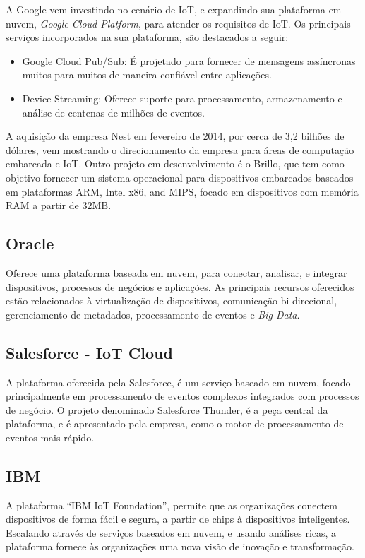 A Google vem investindo no cenário de IoT, e expandindo sua plataforma
em nuvem, \emph{Google Cloud Platform}, para atender os requisitos
de IoT. Os principais serviços incorporados na sua plataforma, são
destacados a seguir:
\begin{itemize}
\item Google Cloud Pub/Sub: É projetado para fornecer de mensagens assíncronas
muitos-para-muitos de maneira confiável entre aplicações.
\item Device Streaming: Oferece suporte para processamento, armazenamento
e análise de centenas de milhões de eventos.
\end{itemize}
A aquisição da empresa Nest em fevereiro de 2014, por cerca de 3,2
bilhões de dólares, vem mostrando o direcionamento da empresa para
áreas de computação embarcada e IoT. Outro projeto em desenvolvimento
é o Brillo, que tem como objetivo fornecer um sistema operacional
para dispositivos embarcados baseados em plataformas ARM, Intel x86,
and MIPS, focado em dispositivos com memória RAM a partir de 32MB.


\subsection{Oracle}

Oferece uma plataforma\cite{oracle:iot} baseada em nuvem, para conectar,
analisar, e integrar dispositivos, processos de negócios e aplicações.
As principais recursos oferecidos estão relacionados à virtualização
de dispositivos, comunicação bi-direcional, gerenciamento de metadados,
processamento de eventos e \emph{Big Data}. 

\subsection{Salesforce - IoT Cloud}

A plataforma oferecida pela Salesforce\cite{salesforce:iot}, é um
serviço baseado em nuvem, focado principalmente em processamento de
eventos complexos integrados com processos de negócio. O projeto denominado
Salesforce Thunder, é a peça central da plataforma, e é apresentado
pela empresa, como o motor de processamento de eventos mais rápido.

\subsection{IBM}

A plataforma ``IBM IoT Foundation''\cite{ibm:iot}, permite que
as organizações conectem dispositivos de forma fácil e segura, a partir
de chips à dispositivos inteligentes. Escalando através de serviços
baseados em nuvem, e usando análises ricas, a plataforma fornece às
organizações uma nova visão de inovação e transformação.

